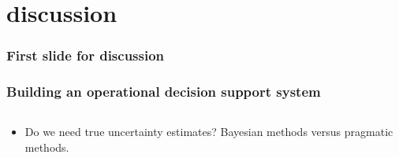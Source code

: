 
\section{discussion}

\begin{frame}
    \frametitle{First slide for discussion}
\end{frame}








\begin{frame}
    \frametitle{Building an operational decision support system}
    \begin{columns}
        \begin{column}{0.6\textwidth}
            \begin{itemize}
                \item Do we need true uncertainty estimates? Bayesian methods versus pragmatic methods.
            \end{itemize}

        \end{column}
    \end{columns}
\end{frame}



